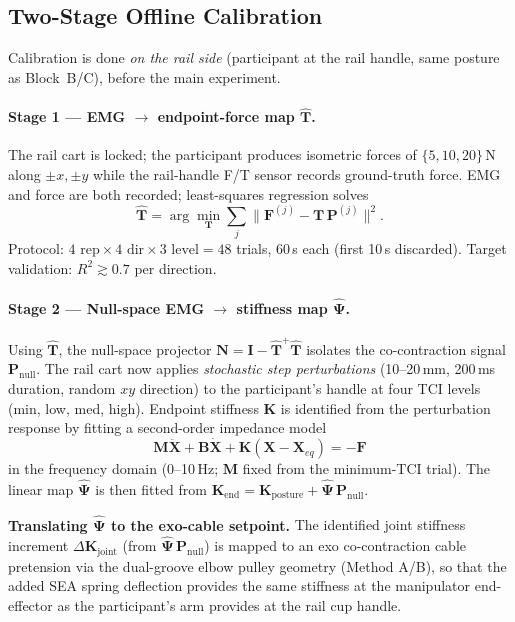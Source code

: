 \documentclass[11pt, a4paper]{article}
\begin{document}
\subsection{Two-Stage Offline Calibration}

Calibration is done \emph{on the rail side} (participant at the rail handle,
same posture as Block~B/C), before the main experiment.

\paragraph{Stage 1 --- EMG \(\to\) endpoint-force map \(\hat{\mathbf T}\).}
The rail cart is locked; the participant produces isometric forces of
\(\{5,10,20\}\,\text{N}\) along \(\pm x,\pm y\) while the rail-handle F/T
sensor records ground-truth force.  EMG and force are both recorded;
least-squares regression solves
\[
  \hat{\mathbf T} = \arg\min_{\mathbf T}
  \sum_j \|\mathbf F^{(j)} - \mathbf T\,\mathbf P^{(j)}\|^2.
\]
Protocol: \(4\text{ rep}\times 4\text{ dir}\times 3\text{ level} = 48\)
trials, 60\,s each (first 10\,s discarded).  Target validation:
\(R^2\!\gtrsim\!0.7\) per direction.

\paragraph{Stage 2 --- Null-space EMG \(\to\) stiffness map \(\hat{\boldsymbol\Psi}\).}
Using \(\hat{\mathbf T}\), the null-space projector
\(\mathbf N = \mathbf I - \hat{\mathbf T}^+\hat{\mathbf T}\)
isolates the co-contraction signal \(\mathbf P_{\text{null}}\).
The rail cart now applies \emph{stochastic step perturbations}
(10--20\,mm, 200\,ms duration, random \(xy\) direction) to the participant's
handle at four TCI levels (min, low, med, high).  Endpoint stiffness
\(\mathbf K\) is identified from the perturbation response by fitting a
second-order impedance model
\[
  \mathbf M\ddot{\mathbf X}+\mathbf B\dot{\mathbf X}
  +\mathbf K(\mathbf X-\mathbf X_{eq}) = -\mathbf F
\]
in the frequency domain (0--10\,Hz; \(\mathbf M\) fixed from the
minimum-TCI trial). The linear map \(\hat{\boldsymbol\Psi}\) is then fitted
from \(\mathbf K_{\text{end}} = \mathbf K_{\text{posture}}
+ \hat{\boldsymbol\Psi}\,\mathbf P_{\text{null}}\).

\textbf{Translating \(\hat{\boldsymbol\Psi}\) to the exo-cable setpoint.}
The identified joint stiffness increment \(\Delta\mathbf K_{\text{joint}}\)
(from \(\hat{\boldsymbol\Psi}\,\mathbf P_{\text{null}}\)) is mapped to an
exo co-contraction cable pretension via the dual-groove elbow pulley
geometry (Method A/B), so that the added SEA spring deflection provides the
same stiffness at the manipulator end-effector as the participant's arm
provides at the rail cup handle.
\end{document}
